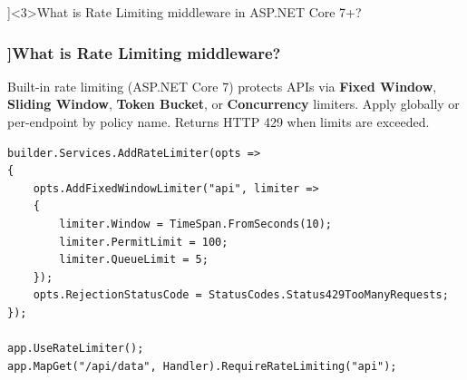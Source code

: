 \QuestionSlide[\CategoryBadge[AspNetColor!20]{ASP.NET Core}]<3>{What is Rate Limiting middleware in ASP.NET Core 7+?}

\begin{frame}[fragile]
  \frametitle{\AnswerTitle[\CategoryBadge[AspNetColor!20]{ASP.NET Core}]{What is Rate Limiting middleware?}}

  {\footnotesize
  Built-in rate limiting (ASP.NET Core 7) protects APIs via \textbf{Fixed Window}, \textbf{Sliding Window}, \textbf{Token Bucket}, or \textbf{Concurrency} limiters. Apply globally or per-endpoint by policy name. Returns HTTP 429 when limits are exceeded.
  }

  \begin{verbatim}
builder.Services.AddRateLimiter(opts =>
{
    opts.AddFixedWindowLimiter("api", limiter =>
    {
        limiter.Window = TimeSpan.FromSeconds(10);
        limiter.PermitLimit = 100;
        limiter.QueueLimit = 5;
    });
    opts.RejectionStatusCode = StatusCodes.Status429TooManyRequests;
});

app.UseRateLimiter();
app.MapGet("/api/data", Handler).RequireRateLimiting("api");
  \end{verbatim}
\end{frame}
